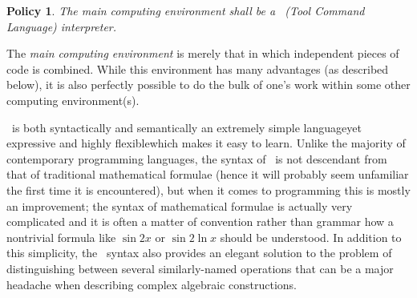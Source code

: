 \documentclass{mtmtcl}
\theoremstyle{plain}
\newtheorem{policy}{Policy}
\theoremstyle{remark}
\begin{document}
\begin{policy} \label{Policy:Tcl}
  The main computing environment shall be a \Tcl~(Tool Command 
  Language) interpreter.
\end{policy}

The \emph{main computing environment} is merely that in which 
independent pieces of code is combined. While this environment has 
many advantages (as described below), it is also perfectly possible 
to do the bulk of one's work within some other computing 
environment(s).

\Tcl\ is both syntactically and semantically an extremely simple 
language\Ldash yet expressive and highly flexible\Rdash which makes 
it easy to learn. Unlike the majority of contemporary programming 
languages, the syntax of \Tcl\ is not descendant from that of 
traditional mathematical formulae (hence it will probably seem 
unfamiliar the first time it is encountered), but when it comes to 
programming this is mostly an improvement; the syntax of mathematical 
formulae is actually very complicated and it is often a matter of 
convention rather than grammar how a nontrivial formula like $\sin 
2x$ or $\sin 2\ln x$ should be understood. In addition to this 
simplicity, the \Tcl\ syntax also provides an elegant solution to 
the problem of distinguishing between several similarly-named 
operations that can be a major headache when describing complex 
algebraic constructions.
\end{document}
